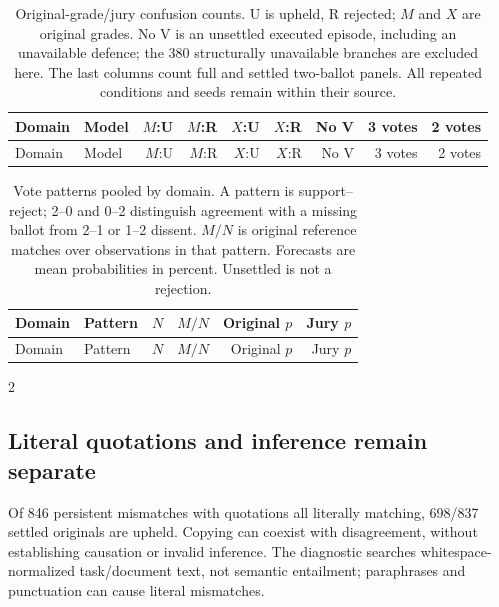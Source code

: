 \begingroup\small\setlength{\tabcolsep}{3pt}
\begin{longtable}{llrrrrrrr}
\caption{Original-grade/jury confusion counts. U is upheld, R rejected;
$M$ and $X$ are original grades. No V is an unsettled executed episode,
including an unavailable defence; the 380 structurally unavailable branches
are excluded here. The last columns count full and settled two-ballot panels.
All repeated conditions and seeds remain within their source.}
\label{tab:diagnostic-jury}\\
\toprule Domain & Model & $M$:U & $M$:R & $X$:U & $X$:R & No V & 3 votes & 2 votes\\\midrule\endfirsthead
\toprule Domain & Model & $M$:U & $M$:R & $X$:U & $X$:R & No V & 3 votes & 2 votes\\\midrule\endhead

\bottomrule\end{longtable}\endgroup

\begingroup\small\setlength{\tabcolsep}{4pt}
\begin{longtable}{llrrrr}
\caption{Vote patterns pooled by domain. A pattern is support--reject;
2--0 and 0--2 distinguish agreement with a missing ballot from 2--1 or 1--2
dissent. $M/N$ is original reference matches over observations in that pattern.
Forecasts are mean probabilities in percent. Unsettled is not a rejection.}
\label{tab:diagnostic-vote-patterns}\\
\toprule Domain & Pattern & $N$ & $M/N$ & Original $p$ & Jury $p$\\\midrule\endfirsthead
\toprule Domain & Pattern & $N$ & $M/N$ & Original $p$ & Jury $p$\\\midrule\endhead

\bottomrule\end{longtable}\endgroup

\begin{multicols}{2}
\subsection{Literal quotations and inference remain separate}
\label{app:diagnostic-citations}
Of 846 persistent mismatches with quotations all literally matching,
698/837 settled originals are upheld. Copying can coexist with disagreement,
without establishing causation or invalid inference. The diagnostic searches
whitespace-normalized task/document text, not semantic entailment;
paraphrases and punctuation can cause literal mismatches.
\end{multicols}

